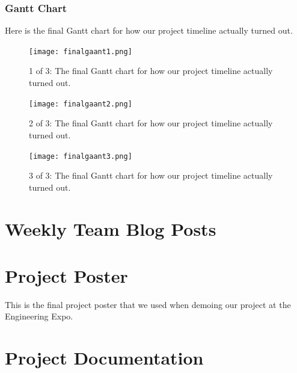 \documentclass[12pt]{article}
\begin{document}
\subsubsection{Gantt Chart}
Here is the final Gantt chart for how our project timeline actually turned out.

\begin{figure}[h!]
  \centering
	\texttt{[image: finalgaant1.png]}
  \caption{1 of 3: The final Gantt chart for how our project timeline actually turned out.}
\end{figure}
\begin{figure}[h!]
  \centering
	\texttt{[image: finalgaant2.png]}
  \caption{2 of 3: The final Gantt chart for how our project timeline actually turned out.}
\end{figure}
\pagebreak

\begin{figure}[h!]
  \centering
	\texttt{[image: finalgaant3.png]}
  \caption{3 of 3: The final Gantt chart for how our project timeline actually turned out.}
\end{figure}
\pagebreak

\section{Weekly Team Blog Posts}

\pagebreak

\section{Project Poster}
This is the final project poster that we used when demoing our project at the Engineering Expo.




\section{Project Documentation}
\end{document}
